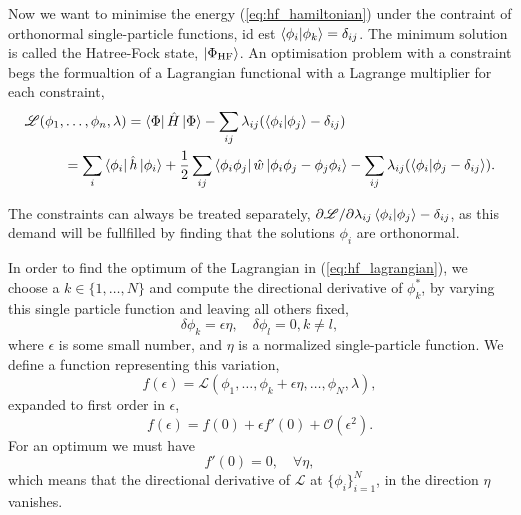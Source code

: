     Now we want to minimise the energy (\autoref{eq:hf_hamiltonian}) under the
    contraint of orthonormal single-particle functions, id est
    $\braket{\phi_i}{\phi_k} = \delta_{ij}$. The minimum solution is called the 
    Hatree-Fock state, $\ket{\Phi_{\text{HF}}}$. An optimisation problem with a 
    constraint begs the formualtion of a Lagrangian functional with a Lagrange
    multiplier for each constraint,
    \begin{equation}
        \label{eq:hf_lagrangian}
        \begin{aligned}
        \mathscr{L}(\phi_1, &\dots, \phi_n, \lambda)
            = \bra{\Phi} \hat{H} \ket{\Phi} 
                - \sum_{ij}\lambda_{ij}(\braket{\phi_i}{\phi_j} - \delta_{ij}) \\
            &= \sum_i \bra{\phi_i} \hat{h} \ket{\phi_i}
                + \frac{1}{2}\sum_{ij} \bra{\phi_i \phi_j} 
                    \hat{w} \ket{\phi_i \phi_j -  \phi_j \phi_i}
                - \sum_{ij} \lambda_{ij} (\braket{\phi_i}{\phi_j - \delta_{ij}}).
        \end{aligned}
    \end{equation}

    The constraints can always be treated separately, 
    $\partial \mathscr{L}/\partial \lambda_{ij} \braket{\phi_i}{\phi_j} - \delta_{ij}$,
    as this demand will be fullfilled by finding that the solutions $\phi_i$ are 
    orthonormal.

    In order to find the optimum of the Lagrangian in (\autoref{eq:hf_lagrangian}),
    we choose a $k \in \{1, \dots, N \}$ and compute the directional derivative of
    $\phi_k^*$, by varying this single particle function and leaving all others fixed,
    \begin{equation}
        \delta \phi_k = \epsilon \eta, \quad \delta \phi_l = 0, k \neq l,
    \end{equation}
    where $\epsilon$ is some small number, and $\eta$ is a normalized single-particle 
    function. We define a function representing this variation,
    \begin{equation}
        \label{eq:variation_hf_lagrangian}
        f(\epsilon) = \mathscr{L} (\phi_1, \dots, \phi_k + \epsilon \eta,
            \dots, \phi_N, \lambda),
    \end{equation}
    expanded to first order in $\epsilon$,
    \begin{equation}
        f(\epsilon) = f(0) + \epsilon f'(0) + \mathscr{O}(\epsilon^2).
    \end{equation}
    For an optimum we must have 
    \begin{equation}
        f'(0) = 0, \quad \forall \eta,
    \end{equation}
    which means that the directional derivative of $\mathscr{L}$ at 
    $\{\phi_i\}_{i=1}^N$, in the direction $\eta$ vanishes.

